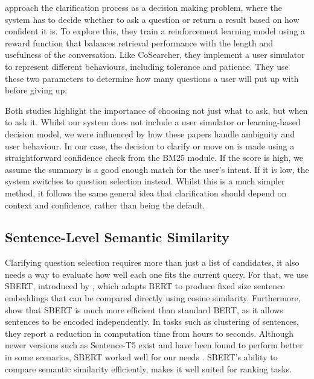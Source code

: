 \documentclass[11pt]{article}
\begin{document}
\citet{Wang2022} approach the clarification process as a decision making problem, where the system has to decide whether to ask a question or return a result based on how confident it is. To explore this, they train a reinforcement learning model using a reward function that balances retrieval performance with the length and usefulness of the conversation. Like CoSearcher, they implement a user simulator to represent different behaviours, including tolerance and patience. They use these two parameters to determine how many questions a user will put up with before giving up.

Both studies highlight the importance of choosing not just what to ask, but when to ask it. Whilst our system does not include a user simulator or learning-based decision model, we were influenced by how these papers handle ambiguity and user behaviour. In our case, the decision to clarify or move on is made using a straightforward confidence check from the BM25 module. If the score is high, we assume the summary is a good enough match for the user's intent. If it is low, the system switches to question selection instead. Whilst this is a much simpler method, it follows the same general idea that clarification should depend on context and confidence, rather than being the default.

\subsection{Sentence-Level Semantic Similarity}
Clarifying question selection requires more than just a list of candidates, it also needs a way to evaluate how well each one fits the current query. For that, we use SBERT, introduced by \citet{Reimers2019}, which adapts BERT to produce fixed size sentence embeddings that can be compared directly using cosine similarity. Furthermore, \citeauthor{Reimers2019} show that SBERT is much more efficient than standard BERT, as it allows sentences to be encoded independently. In tasks such as clustering of sentences, they report a reduction in computation time from hours to seconds. Although newer versions such as Sentence-T5 exist and have been found to perform better in some scenarios, SBERT worked well for our needs \cite{Ni2021}. SBERT's ability to compare semantic similarity efficiently, makes it well suited for ranking tasks.
\end{document}
